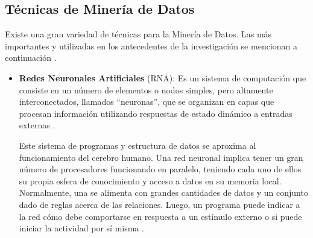 \subsection{Técnicas de Minería de Datos}

Existe una gran variedad de técnicas para la Minería de Datos. Las más importantes y utilizadas en los antecedentes de la investigación se mencionan a continuación \parencite{gl_microsoft2018datamining}.

\begin{itemize}
	\item \textbf{Redes Neuronales Artificiales} (RNA): Es un sistema de computación que consiste en un número de elementos o nodos simples, pero altamente interconectados, llamados “neuronas”, que se organizan en capas que procesan información utilizando respuestas de estado dinámico a entradas externas \parencite{tec_inzaugarat2018ann}.
	
	Este sistema de programas y estructura de datos se aproxima al funcionamiento del cerebro humano. Una red neuronal implica tener un gran número de procesadores funcionando en paralelo, teniendo cada uno de ellos su propia esfera de conocimiento y acceso a datos en su memoria local. Normalmente, una se alimenta con grandes cantidades de datos y un conjunto dado de reglas acerca de las relaciones. Luego, un programa puede indicar a la red cómo debe comportarse en respuesta a un estímulo externo o si puede iniciar la actividad por sí misma \parencite{tec_banafa2019deeplearning}.
	

\end{itemize}

